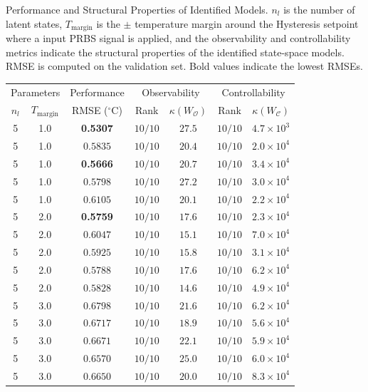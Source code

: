 
\caption{Performance and Structural Properties of Identified Models. $n_l$ is the number of latent states, $T_{\mathrm{margin}}$ is the $\pm$ temperature margin around the Hysteresis setpoint where a input PRBS signal is applied, and the observability and controllability metrics indicate the structural properties of the identified state-space models. RMSE is computed on the validation set. Bold values indicate the lowest RMSEs.}
\label{tab:model_analysis}
\begin{tabular}{cc c cc cc}
\toprule
\multicolumn{2}{c}{Parameters} & \multicolumn{1}{c}{Performance} & \multicolumn{2}{c}{Observability} & \multicolumn{2}{c}{Controllability} \\
\cmidrule(lr){1-2} \cmidrule(lr){3-3} \cmidrule(lr){4-5} \cmidrule(lr){6-7}
$n_l$ & $T_{\mathrm{margin}}$ & RMSE ($^\circ$C) & Rank & $\kappa(W_{\mathcal{O}})$ & Rank & $\kappa(W_{\mathcal{C}})$ \\
\midrule
5 & 1.0 & \textbf{0.5307} & $10/10$ & $27.5$ & $10/10$ & $4.7 \times 10^{3}$ \\
5 & 1.0 & $0.5835$ & $10/10$ & $20.4$ & $10/10$ & $2.0 \times 10^{4}$ \\
5 & 1.0 & \textbf{0.5666} & $10/10$ & $20.7$ & $10/10$ & $3.4 \times 10^{4}$ \\
5 & 1.0 & $0.5798$ & $10/10$ & $27.2$ & $10/10$ & $3.0 \times 10^{4}$ \\
5 & 1.0 & $0.6105$ & $10/10$ & $20.1$ & $10/10$ & $2.2 \times 10^{4}$ \\
5 & 2.0 & \textbf{0.5759} & $10/10$ & $17.6$ & $10/10$ & $2.3 \times 10^{4}$ \\
5 & 2.0 & $0.6047$ & $10/10$ & $15.1$ & $10/10$ & $7.0 \times 10^{4}$ \\
5 & 2.0 & $0.5925$ & $10/10$ & $15.8$ & $10/10$ & $3.1 \times 10^{4}$ \\
5 & 2.0 & $0.5788$ & $10/10$ & $17.6$ & $10/10$ & $6.2 \times 10^{4}$ \\
5 & 2.0 & $0.5828$ & $10/10$ & $14.6$ & $10/10$ & $4.9 \times 10^{4}$ \\
5 & 3.0 & $0.6798$ & $10/10$ & $21.6$ & $10/10$ & $6.2 \times 10^{4}$ \\
5 & 3.0 & $0.6717$ & $10/10$ & $18.9$ & $10/10$ & $5.6 \times 10^{4}$ \\
5 & 3.0 & $0.6671$ & $10/10$ & $22.1$ & $10/10$ & $5.9 \times 10^{4}$ \\
5 & 3.0 & $0.6570$ & $10/10$ & $25.0$ & $10/10$ & $6.0 \times 10^{4}$ \\
5 & 3.0 & $0.6650$ & $10/10$ & $20.0$ & $10/10$ & $8.3 \times 10^{4}$ \\

\end{tabular}
